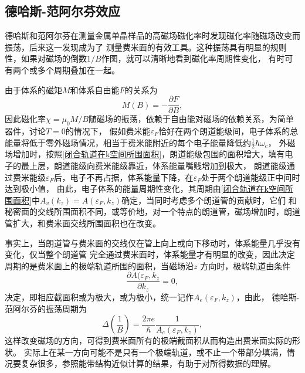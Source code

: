         \subsection{德哈斯-范阿尔芬效应}
            德哈斯和范阿尔芬在测量金属单晶样品的高磁场磁化率时发现磁化率随磁场改变而振荡，后来这一发现成为了
            测量费米面的有效工具。这种振荡具有明显的规则性，如果对磁场的倒数$1/B$作图，就可以清晰地看到磁化率周期性变化，
            有时可有两个或多个周期叠加在一起。

            由于体系的磁矩$M$和体系自由能$F$的关系为
            \begin{equation}
                M(B)=-\frac{\partial F}{\partial B},    
            \end{equation}
            因此磁化率$\chi=\mu_0 M/B$随磁场的振荡，依赖于自由能对磁场的依赖关系，为简单器件，讨论$T=0$的情况下，
            假如费米能$\varepsilon_F$恰好在两个朗道能级间，电子体系的总能量将低于零外磁场情况，相当于费米能附近的每个电子能量降低约$\frac{1}{2}\hbar\omega_c$，
            外磁场增加时，按照\autoref{闭合轨道在k空间所围面积}，朗道能级包围的面积增大，填有电子的最上层，朗道能级向费米能级靠近，体系能量嘴贱增加到极大，
            朗道能级通过费米能级$\varepsilon_F$后，电子不再占据，体系能量下降，在$\varepsilon_F$处于两个朗道能级正中间时达到极小值，
            由此，电子体系的能量周期性变化，其周期由\autoref{闭合轨道在k空间所围面积}中$A_v(k_z)=A(\varepsilon_F,k_z)$确定，当同时考虑多个朗道管的贡献时，它们
            和秘密面的交线所围面积不同，或等价地，对一个特点的朗道管，磁场增加时，朗道管扩大，和费米面交线所围面积也在改变。

            事实上，当朗道管与费米面的交线仅在管上向上或向下移动时，体系能量几乎没有变化，仅当整个朗道管
            完全通过费米面时，体系能量才有明显的改变，因此决定周期的是费米面上的极端轨道所围的面积，当磁场沿$z$
            方向时，极端轨道由条件
            \begin{equation}
                \frac{\partial A(\varepsilon_F,k_z}{\partial k_z}=0,
            \end{equation}
            决定，即相应截面积或为极大，或为极小，统一记作$A_e(\varepsilon_F,k_z)$，由此，
            德哈斯-范阿尔芬的振荡周期为
            \begin{equation}
                \Delta\left(\frac{1}{B}\right)=\frac{2\pi e}{\hbar}\frac{1}{A_e(\varepsilon_F,k_z)}\label{德哈斯-范阿尔芬效应的振荡周期},
            \end{equation}
            这样改变磁场的方向，可得到费米面所有的极端截面积从而构造出费米面实际的形状。
            实际上在某一方向可能不是只有一个极端轨道，或不止一个带部分填满，情况要复杂很多，参照能带结构近似计算的结果，有助于对所得数据的理解。

